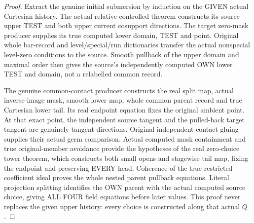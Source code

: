 \begin{proof}
Extract the genuine initial submersion by induction on the GIVEN actual
Cartesian history. The actual relative controlled theorem constructs its
source upper TEST and both upper current cosupport directions. The target
zero-mask producer supplies its true computed lower domain, TEST and point.
Original whole bar-record and level/special/run dictionaries transfer the
actual nonspecial level-zero conditions to the source. Smooth pullback of
the upper domain and maximal order then gives the source's independently
computed OWN lower TEST and domain, not a relabelled common record.

The genuine common-contact producer constructs the real split map, actual
inverse-image mask, smooth lower map, whole common parent record and true
Cartesian lower tail. Its real endpoint equation fixes the original
ambient point. At that exact point, the independent source tangent and the
pulled-back target tangent are genuinely tangent directions. Original
independent-contact gluing supplies their actual germ comparison. Actual
computed mask containment and true original-member avoidance provide the
hypotheses of the real zero-choice tower theorem, which constructs both
small opens and stagewise tail map, fixing the endpoint and preserving
EVERY head. Coherence of the true restricted coefficient ideal proves the
whole nested parent pullback equations. Literal projection splitting
identifies the OWN parent with the actual computed source choice, giving
ALL FOUR field equations before later values. This proof never replaces
the given upper history: every choice is constructed along that actual $Q$.
\end{proof}

